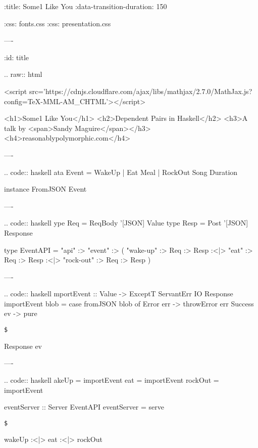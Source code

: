 :title: Some1 Like You
:data-transition-duration: 150

:css: fonts.css
:css: presentation.css


\newenvironment{hs}[1]{.. code:: haskell
}{}
\newenvironment{raw}[1]{.. raw:: html

  <pre>}{
  </pre>
}
\newcommand{\$}{\begin{verbatim}$\end{verbatim}}
\newcommand{\todo}[2]{#2}
\newcommand{\note}[1]{<span class="new">#1</span>}
\newcommand{\wat}[1]{<span class="wat">#1</span>}

----

:id: title

.. raw:: html

  <script src='https://cdnjs.cloudflare.com/ajax/libs/mathjax/2.7.0/MathJax.js?config=TeX-MML-AM_CHTML'></script>

  <h1>Some1 Like You</h1>
  <h2>Dependent Pairs in Haskell</h2>
  <h3>A talk by <span>Sandy Maguire</span></h3>
  <h4>reasonablypolymorphic.com</h4>

----

\begin{hs}
  data Event = WakeUp
             | Eat Meal
             | RockOut Song Duration

  instance FromJSON Event
\end{hs}

----

\begin{hs}
  type Req  = ReqBody '[JSON] Value
  type Resp = Post    '[JSON] Response

  type EventAPI = "api" :> "event" :>
         ( "wake-up"  :> Req :> Resp
      :<|> "eat"      :> Req :> Resp
      :<|> "rock-out" :> Req :> Resp
         )
\end{hs}

----

\begin{hs}
  importEvent :: Value -> ExceptT ServantErr IO Response
  importEvent blob =
    case fromJSON blob of
      Error   err -> throwError err
      Success ev  -> pure \$ Response ev
\end{hs}

----

\begin{hs}
  wakeUp  = importEvent
  eat     = importEvent
  rockOut = importEvent

  eventServer :: Server EventAPI
  eventServer = serve \$
    wakeUp :<|> eat :<|> rockOut
\end{hs}


